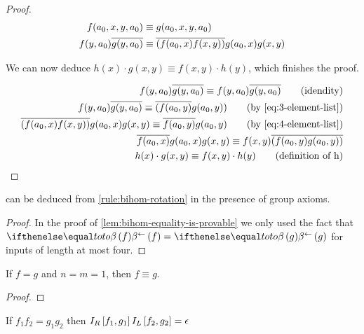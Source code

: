 \begin{proof}
    \begin{align}
        f(a_0, x, y, a_0)        & \equiv g(a_0, x, y, a_0)\notag                                           \\
        f(y, a_0)\overline{g(y, a_0)} & \equiv \overline{(f(a_0, x)f(x, y))}g(a_0, x)g(x, y)\label{eq:4-element-list}
    \end{align}

    We can now deduce $h(x) \cdot g(x, y) \equiv f(x, y) \cdot h(y)$, which finishes the proof.

    \begin{align*}
        f(y, a_0)\inv{g(y, a_0)} \equiv f(y, a_0)\inv{g(y, a_0)} \tag{idendity}                                    \\
        f(y, a_0)\inv{g(y, a_0)} \equiv \inv{(f(a_0, y)}g(a_0, y)) \tag{by \cref{eq:3-element-list}}               \\
        \inv{(f(a_0, x)f(x, y))}g(a_0, x)g(x, y) \equiv \inv{f(a_0, y)}g(a_0, y) \tag{by \cref{eq:4-element-list}} \\
        \inv{f(a_0, x)}g(a_0, x)g(x, y) \equiv f(x, y)\inv{(f(a_0, y)g(a_0, y))}                                   \\
        h(x) \cdot g(x, y) \equiv f(x, y) \cdot h(y) \tag{definition of h}
    \end{align*}

\end{proof}

\begin{corollary}
     can be deduced from \ref{rule:bihom-rotation} in the presence of group axioms.
\end{corollary}
\begin{proof}
    In the proof of \cref{lem:bihom-equality-is-provable} we only used the fact that $\bihom{to, f} = \bihom{to, g}$ for inputs of length at most four.
\end{proof}


\begin{claim}\label{claim:progress_for_one_bihom_in_both_functions}
    If $f = g$ and $n = m = 1$, then $f \equiv g$.
\end{claim}

\begin{proof}
\end{proof}

\begin{claim} \label{claim:interfaces-match}
    If $f_1f_2 = g_1g_2$ then $I_R \left[ f_1, g_1 \right]I_L \left[ f_2, g_2 \right] = \epsilon$
\end{claim}

